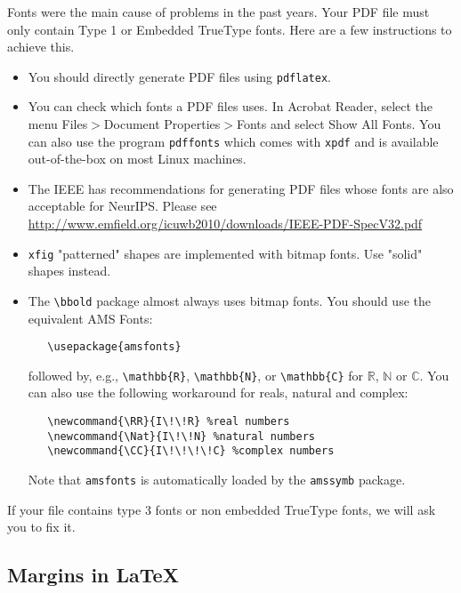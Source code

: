 \documentclass{article}
\begin{document}
Fonts were the main cause of problems in the past years. Your PDF file must only
contain Type 1 or Embedded TrueType fonts. Here are a few instructions to
achieve this.


\begin{itemize}


\item You should directly generate PDF files using \verb+pdflatex+.


\item You can check which fonts a PDF files uses.  In Acrobat Reader, select the
  menu Files$>$Document Properties$>$Fonts and select Show All Fonts. You can
  also use the program \verb+pdffonts+ which comes with \verb+xpdf+ and is
  available out-of-the-box on most Linux machines.


\item The IEEE has recommendations for generating PDF files whose fonts are also
  acceptable for NeurIPS. Please see
  \url{http://www.emfield.org/icuwb2010/downloads/IEEE-PDF-SpecV32.pdf}


\item \verb+xfig+ "patterned" shapes are implemented with bitmap fonts.  Use
  "solid" shapes instead.


\item The \verb+\bbold+ package almost always uses bitmap fonts.  You should use
  the equivalent AMS Fonts:
\begin{verbatim}
   \usepackage{amsfonts}
\end{verbatim}
followed by, e.g., \verb+\mathbb{R}+, \verb+\mathbb{N}+, or \verb+\mathbb{C}+
for $\mathbb{R}$, $\mathbb{N}$ or $\mathbb{C}$.  You can also use the following
workaround for reals, natural and complex:
\begin{verbatim}
   \newcommand{\RR}{I\!\!R} %real numbers
   \newcommand{\Nat}{I\!\!N} %natural numbers
   \newcommand{\CC}{I\!\!\!\!C} %complex numbers
\end{verbatim}
Note that \verb+amsfonts+ is automatically loaded by the \verb+amssymb+ package.


\end{itemize}


If your file contains type 3 fonts or non embedded TrueType fonts, we will ask
you to fix it.


\subsection{Margins in \LaTeX{}}
\end{document}
